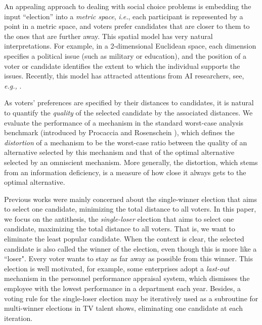 \documentclass[11pt]{article}
\theoremstyle{remark}
\begin{document}
An appealing approach to dealing with social choice problems is embedding the input ``election'' into a \emph{metric space}, \emph{i.e.}, each participant is represented by a point in a metric space, and voters %
prefer candidates that are closer to them to the ones that are further away. This spatial model has very natural interpretations. For example, in a 2-dimensional Euclidean space, each dimension specifies a political issue (such as military or education), and the position of a voter or candidate identifies the extent to which the individual supports the issues. Recently, this model has attracted attentions from AI researchers, see, {\em e.g.,} \cite{anshelevich2015approximating,elkind2017multiwinner,abramowitz2019awareness}.


 As voters' preferences are specified by their distances to candidates,  it is natural to quantify the {\em quality} of the selected candidate by the associated distances. %
  We evaluate the  performance of a mechanism in the standard worst-case analysis benchmark (introduced by Procaccia and Rosenschein \cite{procaccia2006distortion}), which defines the \emph{distortion} of a mechanism to be the worst-case ratio between the quality of an alternative selected by this mechanism and that of the optimal alternative selected by an omniscient mechanism. More generally, the distortion, which stems from an information deficiency, is a measure of how close it always gets to the optimal alternative.

   Previous works were mainly concerned about the single-winner election that aims to select one candidate, minimizing the total distance to all voters. In this paper, we focus on the antithesis, the \emph{single-loser} election that aims to select one candidate, maximizing the total distance to all voters. That is, we want to eliminate the least popular candidate. When the context is clear, the selected candidate is also called the winner of the election, even though this is more like a ``loser". Every voter wants to stay as far away as possible from this winner.
This election is well motivated, for example, some enterprises adopt a \emph{last-out} mechanism in the personnel performance appraisal system, which dismisses the employee with the lowest performance in a department each year. %
Besides, a voting rule for the single-loser election may be iteratively used as a subroutine for multi-winner elections in  TV talent shows, eliminating one candidate at each iteration.
\end{document}
